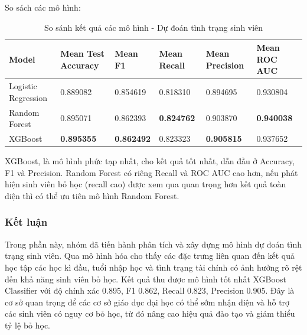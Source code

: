     So sách các mô hình:

    \begin{table}[htbp]
        \centering
        \caption{So sánh kết quả các mô hình - Dự đoán tình trạng sinh viên}
        \label{tab:compare-dropout}
        \begin{tabular}{|p{2cm}|p{2cm}|p{2cm}|p{2cm}|p{2cm}|p{2cm}|}
            \hline
             Model & Mean Test Accuracy & Mean F1 & Mean Recall & Mean Precision & Mean ROC AUC \\
            \hline
            Logistic Regression & 0.889082 & 0.854619 & 0.818310 & 0.894695 & 0.930804 \\
             \hline
             Random Forest & 0.895071 & 0.862393 & \textbf{0.824762} & 0.903870 & \textbf{0.940038} \\
             \hline
            XGBoost & \textbf{0.895355} & \textbf{0.862492} & 0.823323 & \textbf{0.905815} & 0.937652 \\
            \hline
        \end{tabular}
    \end{table}

    \FloatBarrier

    XGBoost, là mô hình phức tạp nhất, cho kết quả tốt nhất, dẫn đầu ở Accuracy, F1 và Precision. Random Forest có riêng Recall và ROC AUC cao hơn, nếu phát hiện sinh viên bỏ học (recall cao) được xem qua quan trọng hơn kết quả toàn diện thì có thể ưu tiên mô hình Random Forest.

\subsubsection{Kết luận}
    Trong phần này, nhóm đã tiến hành phân tích và xây dựng mô hình dự đoán tình trạng sinh viên. Qua mô hình hóa cho thấy các đặc trưng liên quan đến kết quả học tập các học kì đầu, tuổi nhập học và tình trạng tài chính có ảnh hưởng rõ rệt đến khả năng sinh viên bỏ học. Kết quả thu được mô hình tốt nhất XGBoost Classifier với độ chính xác 0.895, F1 0.862, Recall 0.823, Precision 0.905. Đây là cơ sở quan trọng để các cơ sở giáo dục đại học có thể sớm nhận diện và hỗ trợ các sinh viên có nguy cơ bỏ học, từ đó nâng cao hiệu quả đào tạo và giảm thiểu tỷ lệ bỏ học.